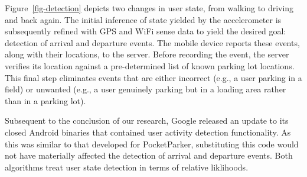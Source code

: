 Figure~\ref{fig-detection} depicts two changes in user state, from walking to
driving and back again.  The initial inference of state yielded by the
accelerometer is subsequently refined with GPS and WiFi sense data to
yield the desired goal:  detection of arrival and departure events.  The mobile
device reports these events, along with their locations, to the server.  Before
recording the event, the server verifies its location against a pre-determined
list of known parking lot locations.  This final step eliminates events that
are either incorrect (e.g., a user parking in a field) or unwanted (e.g., a
user genuinely parking but in a loading area rather than in a parking lot).

Subsequent to the conclusion of our research, Google released an update to its
closed Android binaries that contained user activity detection functionality.
As this was similar to that developed for PocketParker, substituting this
code would not have materially affected the detection of arrival and departure 
events.  Both algorithms treat user state detection in terms of relative
liklihoods.~\cite{recognition-confidence}  

